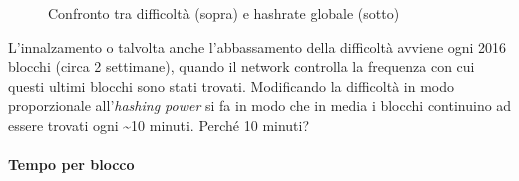 \documentclass {article}
\begin{document}
\vspace {0.5cm}
\begin{figure}[htb!]
\caption {Confronto tra difficoltà (sopra) e hashrate globale (sotto)}
\end{figure}
\vspace {0.2cm}
\noindent
%
L'innalzamento o talvolta anche l'abbassamento della difficoltà avviene ogni 2016 blocchi (circa 2 settimane), quando il network controlla la frequenza con cui questi ultimi blocchi sono stati trovati.
Modificando la difficoltà in modo proporzionale all'\textit{hashing power} si fa in modo che in media i blocchi continuino ad essere trovati ogni \textasciitilde 10 minuti. Perché 10 minuti?

\paragraph {Tempo per blocco}
\end{document}
